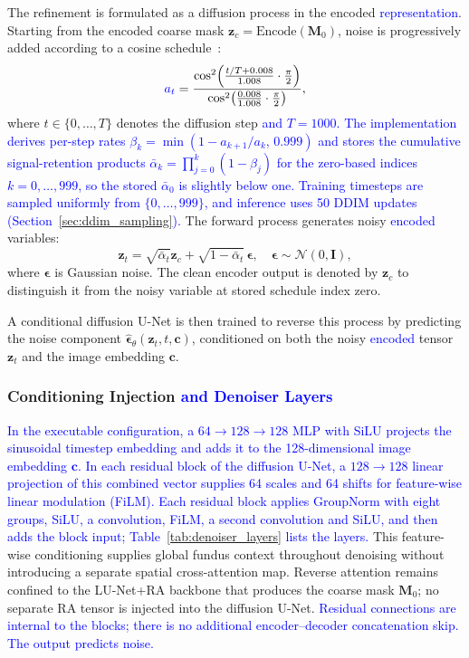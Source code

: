 \documentclass[jimaging,article,submit,pdftex,moreauthors]
  {Definitions/mdpi}
\DeclareRobustCommand{\rev}[1]{\textcolor{blue}{#1}}
\DeclareRobustCommand{\rev}[1]{#1}
\providecommand{\linelabel}[1]{}
\newcommand{\seclabel}[1]{\linelabel{rev:sec:#1}}
\newcommand{\secend}[1]{\linelabel{rev:end:#1}}
\begin{document}
The refinement is formulated as a diffusion process in the encoded \rev{representation}. Starting from the encoded coarse mask $\mathbf{z}_c=\mathrm{Encode}(\mathbf{M}_0)$, noise is progressively added according to a cosine schedule~\cite{Nichol2021}:
\begin{equation}
\rev{a_t}=\frac{\cos^2\!\left(\frac{t/T+0.008}{1.008}\cdot\frac{\pi}{2}\right)}{\cos^2\!\left(\frac{0.008}{1.008}\cdot\frac{\pi}{2}\right)},
\end{equation}
where $t\in\{0,\dots,T\}$ denotes the diffusion step \rev{and $T=1000$. The implementation derives per-step rates $\beta_k=\min(1-a_{k+1}/a_k,\,0.999)$ and stores the cumulative signal-retention products $\bar{\alpha}_k=\prod_{j=0}^{k}(1-\beta_j)$ for the zero-based indices $k=0,\ldots,999$, so the stored $\bar{\alpha}_0$ is slightly below one. Training timesteps are sampled uniformly from $\{0,\ldots,999\}$, and inference uses 50 DDIM updates (Section~\ref{sec:ddim_sampling}).} The forward process generates noisy \rev{encoded} variables:
\begin{equation}
\mathbf{z}_t=\sqrt{\bar{\alpha}_t}\mathbf{z}_c+\sqrt{1-\bar{\alpha}_t}\,\boldsymbol{\epsilon}, 
\quad \boldsymbol{\epsilon}\sim\mathcal{N}(0,\mathbf{I}),
\end{equation}
where $\boldsymbol{\epsilon}$ is Gaussian noise. The clean encoder output is denoted by $\mathbf{z}_c$ to distinguish it from the noisy variable at stored schedule index zero.

A conditional diffusion U-Net is then trained to reverse this process by predicting the noise component $\hat{\boldsymbol{\epsilon}}_\theta(\mathbf{z}_t,t,\mathbf{c})$, conditioned on both the noisy \rev{encoded} tensor $\mathbf{z}_t$ and the image embedding $\mathbf{c}$.


\subsubsection{Conditioning Injection \rev{and Denoiser Layers}}
\label{sec:conditioning}
\seclabel{conditioning}

\rev{In the executable configuration, a $64\rightarrow128\rightarrow128$ MLP with SiLU projects the sinusoidal timestep embedding and adds it to the 128-dimensional image embedding $\mathbf{c}$. In each residual block of the diffusion U-Net, a $128\rightarrow128$ linear projection of this combined vector supplies 64 scales and 64 shifts for feature-wise linear modulation (FiLM). Each residual block applies GroupNorm with eight groups, SiLU, a convolution, FiLM, a second convolution and SiLU, and then adds the block input; Table~\ref{tab:denoiser_layers} lists the layers.} This feature-wise conditioning supplies global fundus context throughout denoising without introducing a separate spatial cross-attention map. Reverse attention remains confined to the LU-Net+RA backbone that produces the coarse mask $\mathbf{M}_0$; no separate RA tensor is injected into the diffusion U-Net. \rev{Residual connections are internal to the blocks; there is no additional encoder--decoder concatenation skip. The output predicts noise.}\secend{conditioning}
\end{document}

